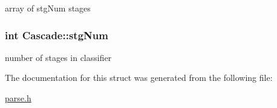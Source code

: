 array of stg\+Num stages 

\hypertarget{structCascade_a4b27d7fb305d67702974f852a33ae5f8}{}
\subsubsection[{stg\+Num}]{\setlength{\rightskip}{0pt plus 5cm}int Cascade\+::stg\+Num}\label{structCascade_a4b27d7fb305d67702974f852a33ae5f8}


number of stages in classifier 



The documentation for this struct was generated from the following file\+:\begin{DoxyCompactItemize}
\item 
\hyperlink{parse_8h}{parse.\+h}\end{DoxyCompactItemize}

